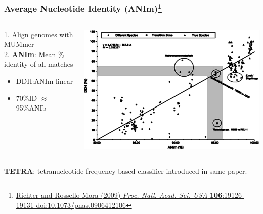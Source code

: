 \begin{frame}
  \frametitle{Average Nucleotide Identity (ANIm)\footnote{\tiny{\href{http://dx.doi.org/10.1073/pnas.0906412106}{Richter and Rossello-Mora (2009) \textit{Proc. Natl. Acad. Sci. USA} \textbf{106}:19126-19131 doi:10.1073/pnas.0906412106}}}}
  \begin{columns}[T]
    \begin{column}{3cm}
      1. Align genomes with MUMmer\\
      2. \textbf{ANIm}: Mean \% identity of all matches\\[0.25cm]
      \begin{itemize}
        \item DDH:ANIm linear
        \item 70\%ID $\approx$ 95\%ANIb
      \end{itemize}
    \end{column}
    \begin{column}{7cm}
      \includegraphics[width=1\textwidth]{images/ddh_anim}
    \end{column}
  \end{columns}
  \textbf{TETRA}: tetranucleotide frequency-based classifier introduced in same paper.
\end{frame}

